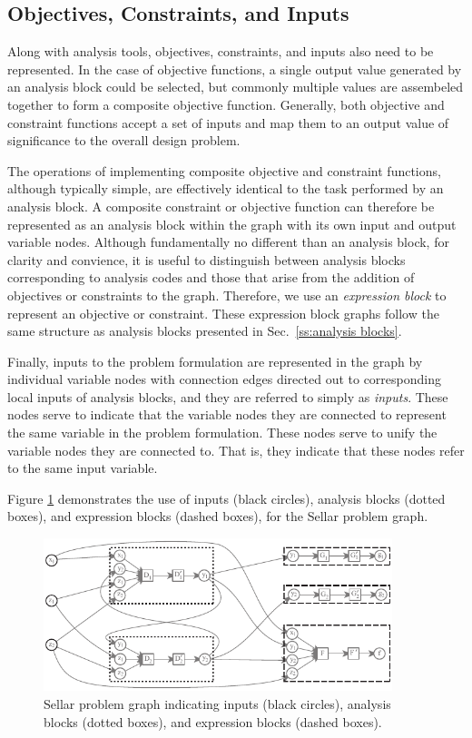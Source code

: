 \subsection{Objectives, Constraints, and Inputs}
\label{ss:objectives and constraints}
Along with analysis tools, objectives, constraints, and inputs also need to be represented.
In the case of objective functions, a single output value generated by an analysis block could be selected, but commonly multiple values are assembeled together to form a composite objective function. 
Generally, both objective and constraint functions accept a set of inputs and map them to an output value of significance to the overall design problem. 

The operations of implementing composite objective and constraint functions, although typically simple, are effectively identical to the task performed by an analysis block. 
A composite constraint or objective function can therefore be represented as an analysis block within the graph with its own input and output variable nodes. 
Although fundamentally no different than an analysis block, for clarity and convience, it is useful to distinguish between analysis blocks corresponding to analysis codes and those that arise from the addition of objectives or constraints to the graph. 
Therefore, we use an \emph{expression block} to represent an objective or constraint. 
These expression block graphs follow the same structure as analysis blocks presented in Sec.~\ref{ss:analysis blocks}.

Finally, inputs to the problem formulation are represented in the graph by individual variable nodes with connection edges directed out to corresponding local inputs of analysis blocks, and they are referred to simply as \emph{inputs}. 
These nodes serve to indicate that the variable nodes they are connected to represent the same variable in the problem formulation.
These nodes serve to unify the variable nodes they are connected to. That is, they indicate that these nodes refer to the same input variable.

Figure \ref{f:obj-cons} demonstrates the use of inputs (black circles), analysis blocks (dotted boxes), and expression blocks (dashed boxes), for the Sellar problem graph.
\begin{figure}[htb!]
  \begin{center}
    \includegraphics[width=4.0in]{images/sellar_obj_and_cons}
  \end{center}
  \caption{Sellar problem graph indicating inputs (black circles), analysis blocks (dotted boxes), and expression blocks (dashed boxes).}
\label{f:obj-cons}
\end{figure} 

